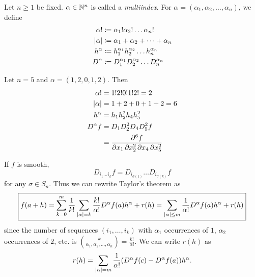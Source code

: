 \begin{definition}[multiindex] \label{def:multiindex}
    Let $n \ge 1$ be fixed.
    $\alpha \in \mathbb{N}^n$ is called a \emph{multiindex}.
    For $\alpha = (\alpha_1, \alpha_2, \dots, \alpha_n)$, we define
    \begin{align*}
        \alpha! &\coloneqq \alpha_1! \alpha_2! \dots \alpha_n! \\
        \lvert\alpha\rvert &\coloneqq \alpha_1 + \alpha_2 + \dots + \alpha_n \\
        h^\alpha &\coloneqq h_1^{\alpha_1} h_2^{\alpha_2} \dots h_n^{\alpha_n} \\
        D^\alpha &\coloneqq D_1^{\alpha_1} D_2^{\alpha_2} \dots D_n^{\alpha_n}
    \end{align*}
\end{definition}
\begin{example}
    Let $n = 5$ and $\alpha = (1, 2, 0, 1, 2)$.
    Then \begin{align*}
        \alpha! &= 1! 2! 0! 1! 2! = 2 \\
        \lvert\alpha\rvert &= 1 + 2 + 0 + 1 + 2 = 6 \\
        h^\alpha &= h_1 h_2^2 h_4 h_5^2 \\
        D^\alpha f &= D_1 D_2^2 D_4 D_5^2 f \\
        &= \pdv[order={1,2,1,2}]{f}{x_1, x_2, x_4, x_5}
    \end{align*}
\end{example}

If $f$ is smooth, \[
    D_{i_1 \dots i_k} f = D_{i_{\sigma(1)}} \dots D_{i_{\sigma(k)}} f
\] for any $\sigma \in S_n$.
Thus we can rewrite Taylor's theorem as \begin{equation*}
    \boxed{
        f(a + h) = \sum_{k=0}^{m} \frac1{k!} \sum_{\lvert\alpha\rvert = k}
            \frac{k!}{\alpha!} D^\alpha f(a) h^\alpha + r(h)
        = \sum_{\lvert\alpha\rvert \le m}
            \frac{1}{\alpha!} D^\alpha f(a) h^\alpha + r(h)
    }
\end{equation*}
since the number of sequences $(i_1, \dots, i_k)$ with
$\alpha_1$ occurrences of $1$, $\alpha_2$ occurrences of $2$, etc.
is $\binom{k}{\alpha_1, \alpha_2, \dots, \alpha_n} = \frac{k!}{\alpha!}$.
We can write $r(h)$ as \[
    r(h) = \sum_{\lvert\alpha\rvert = m} \frac{1}{\alpha!}
        (D^\alpha f(c) - D^\alpha f(a)) h^\alpha.
\]

